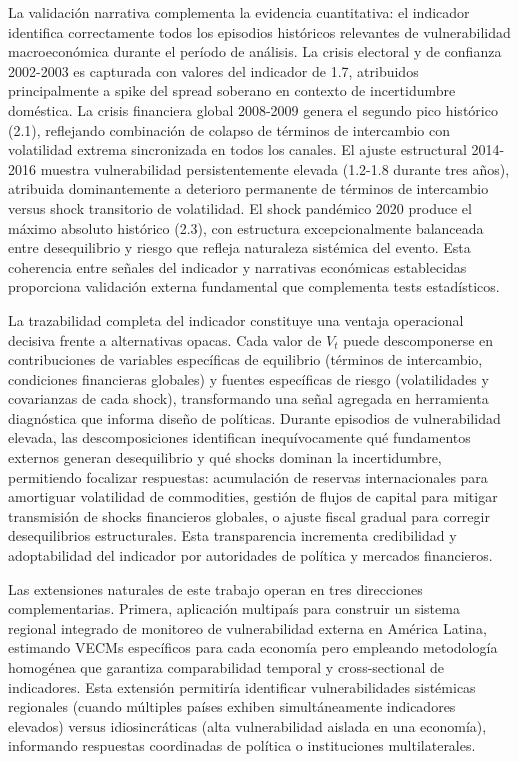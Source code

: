 \documentclass[3p,11pt,draft,natbib=false]{elsarticle}
\begin{document}
La validación narrativa complementa la evidencia cuantitativa: el indicador identifica correctamente todos los episodios históricos relevantes de vulnerabilidad macroeconómica durante el período de análisis. La crisis electoral y de confianza 2002-2003 es capturada con valores del indicador de 1.7, atribuidos principalmente a spike del spread soberano en contexto de incertidumbre doméstica. La crisis financiera global 2008-2009 genera el segundo pico histórico (2.1), reflejando combinación de colapso de términos de intercambio con volatilidad extrema sincronizada en todos los canales. El ajuste estructural 2014-2016 muestra vulnerabilidad persistentemente elevada (1.2-1.8 durante tres años), atribuida dominantemente a deterioro permanente de términos de intercambio versus shock transitorio de volatilidad. El shock pandémico 2020 produce el máximo absoluto histórico (2.3), con estructura excepcionalmente balanceada entre desequilibrio y riesgo que refleja naturaleza sistémica del evento. Esta coherencia entre señales del indicador y narrativas económicas establecidas proporciona validación externa fundamental que complementa tests estadísticos.

La trazabilidad completa del indicador constituye una ventaja operacional decisiva frente a alternativas opacas. Cada valor de $V_t$ puede descomponerse en contribuciones de variables específicas de equilibrio (términos de intercambio, condiciones financieras globales) y fuentes específicas de riesgo (volatilidades y covarianzas de cada shock), transformando una señal agregada en herramienta diagnóstica que informa diseño de políticas. Durante episodios de vulnerabilidad elevada, las descomposiciones identifican inequívocamente qué fundamentos externos generan desequilibrio y qué shocks dominan la incertidumbre, permitiendo focalizar respuestas: acumulación de reservas internacionales para amortiguar volatilidad de commodities, gestión de flujos de capital para mitigar transmisión de shocks financieros globales, o ajuste fiscal gradual para corregir desequilibrios estructurales. Esta transparencia incrementa credibilidad y adoptabilidad del indicador por autoridades de política y mercados financieros.

Las extensiones naturales de este trabajo operan en tres direcciones complementarias. Primera, aplicación multipaís para construir un sistema regional integrado de monitoreo de vulnerabilidad externa en América Latina, estimando VECMs específicos para cada economía pero empleando metodología homogénea que garantiza comparabilidad temporal y cross-sectional de indicadores. Esta extensión permitiría identificar vulnerabilidades sistémicas regionales (cuando múltiples países exhiben simultáneamente indicadores elevados) versus idiosincráticas (alta vulnerabilidad aislada en una economía), informando respuestas coordinadas de política o instituciones multilaterales.
\end{document}
